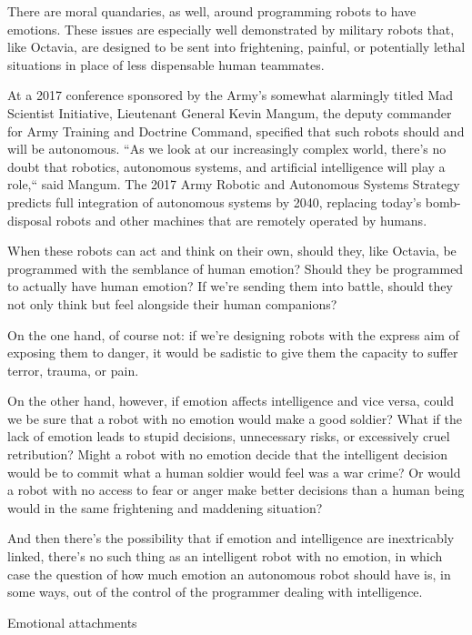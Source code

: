 \documentclass[9pt,a4paper]{extarticle}
\makeatletter
\newlength{\newsleading}
\renewcommand{\subsection}[1]{%
  \par\addpenalty{\@secpenalty}\addvspace{\newsleading}%
  \begingroup
    \sffamily\bfseries\fontsize{8}{\newsleading}\selectfont
    \interlinepenalty=10000
    \noindent\strut #1\strut\par
  \endgroup
  \nobreak\@afterindentfalse\@afterheading
}
\makeatother
\begin{document}
There are moral quandaries, as well, around programming robots to have emotions. These issues are especially well demonstrated by military robots that, like Octavia, are designed to be sent into frightening, painful, or potentially lethal situations in place of less dispensable human teammates.

At a 2017 conference sponsored by the Army’s somewhat alarmingly titled Mad Scientist Initiative, Lieutenant General Kevin Mangum, the deputy commander for Army Training and Doctrine Command, specified that such robots should and will be autonomous. “As we look at our increasingly complex world, there’s no doubt that robotics, autonomous systems, and artificial intelligence will play a role,“ said Mangum. The 2017 Army Robotic and Autonomous Systems Strategy predicts full integration of autonomous systems by 2040, replacing today’s bomb-disposal robots and other machines that are remotely operated by humans.

When these robots can act and think on their own, should they, like Octavia, be programmed with the semblance of human emotion? Should they be programmed to actually have human emotion? If we’re sending them into battle, should they not only think but feel alongside their human companions?

On the one hand, of course not: if we’re designing robots with the express aim of exposing them to danger, it would be sadistic to give them the capacity to suffer terror, trauma, or pain.

On the other hand, however, if emotion affects intelligence and vice versa, could we be sure that a robot with no emotion would make a good soldier? What if the lack of emotion leads to stupid decisions, unnecessary risks, or excessively cruel retribution? Might a robot with no emotion decide that the intelligent decision would be to commit what a human soldier would feel was a war crime? Or would a robot with no access to fear or anger make better decisions than a human being would in the same frightening and maddening situation?

And then there’s the possibility that if emotion and intelligence are inextricably linked, there’s no such thing as an intelligent robot with no emotion, in which case the question of how much emotion an autonomous robot should have is, in some ways, out of the control of the programmer dealing with intelligence.

\subsection{Emotional attachments}
\end{document}
